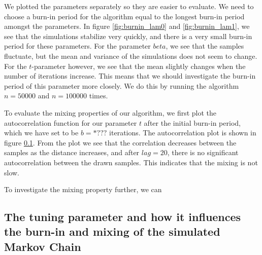 We plotted the parameters separately so they are easier to evaluate. We need to choose a burn-in period for the algorithm equal to the longest burn-in period amongst the parameters. 
In figure \ref{fig:burnin_lam0} and \ref{fig:burnin_lam1}, we see that the simulations stabilize very quickly, and there is a very small burn-in period for these parameters.
For the parameter $beta$, we see that the samples fluctuate, but the mean and variance of the simulations does not seem to change. For the $t$-parameter however, we see that the mean slightly changes when the number of iterations increase. This means that we should investigate the burn-in period of this parameter more closely. 
We do this by running the algorithm $n = 50000$ and $n = 100000$ times. 


To evaluate the mixing properties of our algorithm, we first plot the autocorrelation function for our parameter $t$ after the initial burn-in period, which we have set to be $b = *???$ iterations. The autocorrelation plot is shown in figure \ref{}. From the plot we see that the correlation decreases between the samples as the distance increases, and after $lag = 20$, there is no significant autocorrelation between the drawn samples. This indicates that the mixing is not slow. 

To investigate the mixing property further, we can 

\subsection{The tuning parameter and how it influences the burn-in and mixing of the simulated Markov Chain}


